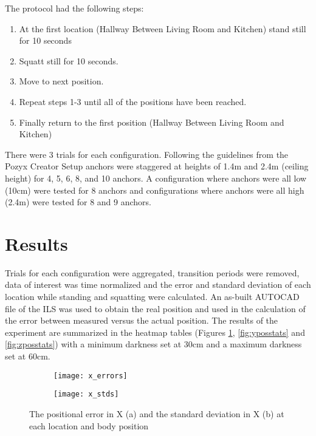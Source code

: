 The protocol had the following steps:
\begin{enumerate}
    \item At the first location (Hallway Between Living Room and Kitchen) stand still for 10 seconds
    \item Squatt still for 10 seconds.
    \item Move to next position.
    \item Repeat steps 1-3 until all of the positions have been reached.
    \item Finally return to the first position (Hallway Between Living Room and Kitchen)
\end{enumerate}

There were 3 trials for each configuration. Following the guidelines from 
the Pozyx Creator Setup \cite{noauthor_configuration_nodate} anchors were 
staggered at heights of 1.4m and 2.4m (ceiling height) for 4, 5, 6, 8, and 10 anchors.
A configuration where anchors were all low (10cm) were tested for 8 anchors and configurations
where anchors were all high (2.4m) were tested for 8 and 9 anchors.

\section{Results}
Trials for each configuration were aggregated, transition periods were removed, 
data of interest was time normalized and the error and standard deviation of each
location while standing and squatting were calculated. An as-built AUTOCAD file of the 
ILS was used to obtain the real position and used in the calculation of the error 
between measured versus the actual position. The results of the experiment are summarized
in the heatmap tables (Figures \ref{fig:xposstats}, \ref{fig:yposstats} and \ref{fig:zposstats}) 
with a minimum darkness set at 30cm and a maximum darkness set at 60cm.

\begin{figure}[ht]
    \centering
    \begin{subfigure}[b]{\textwidth}
        \centering
        \texttt{[image: x\_errors]}
        \caption{}
    \end{subfigure}
    \begin{subfigure}[b]{\textwidth}
        \centering
        \texttt{[image: x\_stds]}
        \caption{}
    \end{subfigure}
    \caption{The positional error in X (a) and the standard deviation in X (b) at each location
    and body position
    }
    \label{fig:xposstats}
\end{figure}

